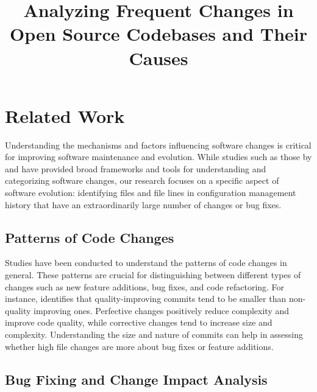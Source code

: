 \documentclass{article}
\title{Analyzing Frequent Changes in Open Source Codebases and Their Causes}
\begin{document}
\maketitle

\section{Related Work}

Understanding the mechanisms and factors influencing software changes is critical for improving software maintenance and evolution. While studies such as those by \cite{buckley2005towards} and \cite{mens2003towards} have provided broad frameworks and tools for understanding and categorizing software changes, our research focuses on a specific aspect of software evolution: identifying files and file lines in configuration management history that have an extraordinarily large number of changes or bug fixes.

\subsection{Patterns of Code Changes}

Studies have been conducted to understand the patterns of code changes in general. These patterns are crucial for distinguishing between different types of changes such as new feature additions, bug fixes, and code refactoring. For instance, \cite{trautsch2023really} identifies that quality-improving commits tend to be smaller than non-quality improving ones. Perfective changes positively reduce complexity and improve code quality, while corrective changes tend to increase size and complexity. Understanding the size and nature of commits can help in assessing whether high file changes are more about bug fixes or feature additions.

\subsection{Bug Fixing and Change Impact Analysis}
\end{document}
